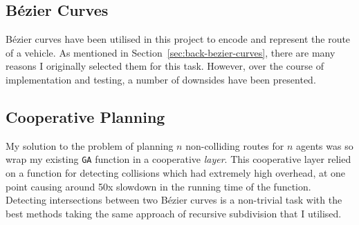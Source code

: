 

\subsection{Bézier Curves}

Bézier curves have been utilised in this project to encode and represent the route of a vehicle. As mentioned in Section~\ref{sec:back-bezier-curves}, there are many reasons I originally selected them for this task. However, over the course of implementation and testing, a number of downsides have been presented.

\subsection{Cooperative Planning}
\label{subsec:eval-cooperativeplanning}

My solution to the problem of planning $n$ non-colliding routes for $n$ agents was so wrap my existing \texttt{GA} function in a cooperative \textit{layer}. This cooperative layer relied on a function for detecting collisions which had extremely high overhead, at one point causing around 50x slowdown in the running time of the function. Detecting intersections between two Bézier curves is a non-trivial task with the best methods taking the same approach of recursive subdivision that I utilised.






